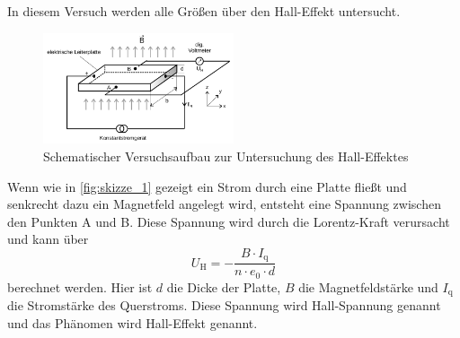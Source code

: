 In diesem Versuch werden alle Größen über den Hall-Effekt untersucht.
\begin{figure}
    \centering
    \includegraphics[width=0.5\textwidth]{images/skizze_1.png}
    \caption{Schematischer Versuchsaufbau zur Untersuchung des Hall-Effektes\cite{V311}}
    \label{fig:skizze_1}
\end{figure}
Wenn wie in \autoref{fig:skizze_1} gezeigt ein Strom durch eine Platte fließt und senkrecht dazu ein Magnetfeld angelegt wird, entsteht eine Spannung zwischen den Punkten A und B.
Diese Spannung wird durch die Lorentz-Kraft verursacht und kann über
\begin{equation}
    U_\text{H} = -\frac{B \cdot I_\text{q}}{n \cdot e_0 \cdot d}
    \label{eq:hallspannung}
\end{equation}
berechnet werden. 
Hier ist $d$ die Dicke der Platte, $B$ die Magnetfeldstärke und $I_\text{q}$ die Stromstärke des Querstroms.
Diese Spannung wird Hall-Spannung genannt und das Phänomen wird Hall-Effekt genannt.\cite{V311}

